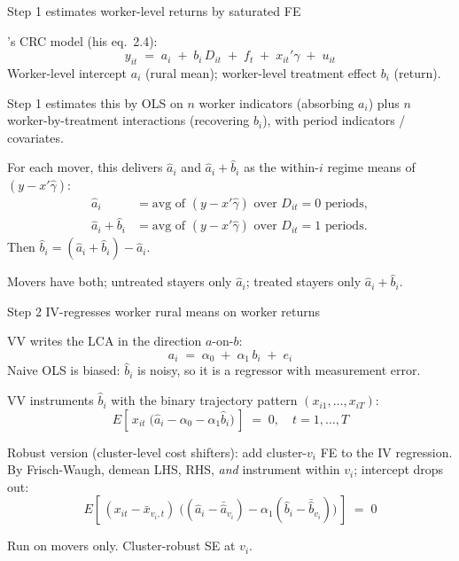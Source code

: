 \documentclass[10pt,aspectratio=169]{beamer}
\newcommand{\D}{D}
\newcommand{\vii}{v_{i}}
\begin{document}
\begin{frame}{Step 1 estimates worker-level returns by saturated FE}

  \citet{verdierAverageTreatmentEffects2020a}'s CRC model (his eq.\ 2.4):
  \[
    y_{it} \;=\; a_i \;+\; b_i\, \D_{it} \;+\; f_t \;+\; x_{it}'\gamma \;+\; u_{it}
  \]
  Worker-level intercept $a_i$ (rural mean); worker-level treatment effect $b_i$ (return).

  \vspace{0.3em}
  Step 1 estimates this by OLS on $n$ worker indicators (absorbing $a_i$) plus $n$ worker-by-treatment interactions (recovering $b_i$), with period indicators / covariates.

  \vspace{0.3em}
  For each mover, this delivers $\hat a_i$ and $\hat a_i + \hat b_i$ as the within-$i$ regime means of $(y - x'\hat\gamma)$:
  \begin{align*}
    \hat a_i &= \text{avg of }(y - x'\hat\gamma)\text{ over }\D_{it} = 0\text{ periods}, \\
    \hat a_i + \hat b_i &= \text{avg of }(y - x'\hat\gamma)\text{ over }\D_{it} = 1\text{ periods}.
  \end{align*}
  Then $\hat b_i = (\hat a_i + \hat b_i) - \hat a_i$.

  \vspace{0.2em}
  Movers have both; untreated stayers only $\hat a_i$; treated stayers only $\hat a_i + \hat b_i$.

\end{frame}

\begin{frame}{Step 2 IV-regresses worker rural means on worker returns}

  VV writes the LCA in the direction $a$-on-$b$:
  \[
    a_i \;=\; \alpha_0 \;+\; \alpha_1\, b_i \;+\; e_i
  \]
  Naive OLS is biased: $\hat b_i$ is noisy, so it is a regressor with measurement error.

  \vspace{0.4em}
  VV instruments $\hat b_i$ with the binary trajectory pattern $(x_{i1}, \ldots, x_{iT})$:
  \[
    E\!\left[\, x_{it}\;\bigl(\hat a_i - \alpha_0 - \alpha_1 \hat b_i\bigr)\,\right] \;=\; 0, \quad t = 1, \ldots, T
  \]

  \vspace{0.4em}
  Robust version (cluster-level cost shifters): add cluster-$\vii$ FE to the IV regression.
  By Frisch-Waugh, demean LHS, RHS, \emph{and} instrument within $\vii$; intercept drops out:
  \[
    E\!\left[\, (x_{it} - \bar x_{\vii,t})\;\bigl((\hat a_i - \bar{\hat a}_{\vii}) - \alpha_1 (\hat b_i - \bar{\hat b}_{\vii})\bigr)\,\right] \;=\; 0
  \]

  \vspace{0.3em}
  Run on movers only.
  Cluster-robust SE at $\vii$.

\end{frame}
\end{document}
